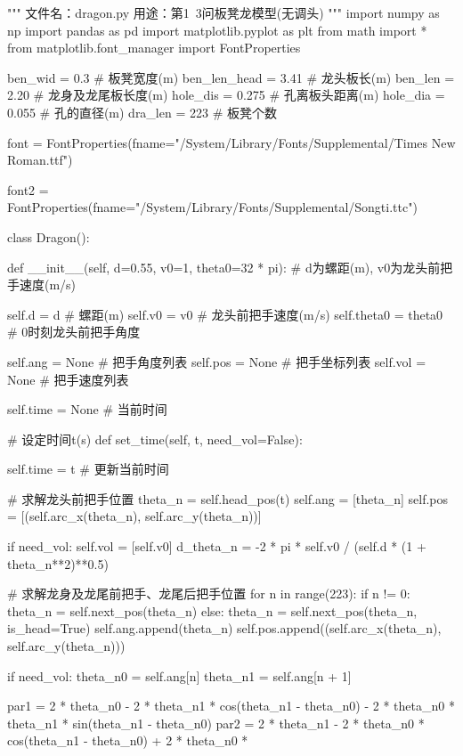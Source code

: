\documentclass[withoutpreface,bwprint]{cumcmthesis}
\begin{document}
\begin{CodeText}
"""
文件名：dragon.py
用途：第1~3问板凳龙模型(无调头)
"""
import numpy as np
import pandas as pd
import matplotlib.pyplot as plt
from math import *
from matplotlib.font_manager import FontProperties

ben_wid = 0.3 # 板凳宽度(m)
ben_len_head = 3.41 # 龙头板长(m)
ben_len = 2.20 # 龙身及龙尾板长度(m)
hole_dis = 0.275 # 孔离板头距离(m)
hole_dia = 0.055 # 孔的直径(m)
dra_len = 223 # 板凳个数

font = FontProperties(fname="/System/Library/Fonts/Supplemental/Times New Roman.ttf")



font2 = FontProperties(fname="/System/Library/Fonts/Supplemental/Songti.ttc")


class Dragon():

   def __init__(self, d=0.55, v0=1, theta0=32 * pi): # d为螺距(m), v0为龙头前把手速度(m/s)

      self.d = d # 螺距(m)
      self.v0 = v0 # 龙头前把手速度(m/s)
      self.theta0 = theta0 # 0时刻龙头前把手角度

      self.ang = None # 把手角度列表
      self.pos = None # 把手坐标列表
      self.vol = None # 把手速度列表

      self.time = None # 当前时间

   # 设定时间t(s)
   def set_time(self, t, need_vol=False):

      self.time = t # 更新当前时间

      # 求解龙头前把手位置
      theta_n = self.head_pos(t)
      self.ang = [theta_n]
      self.pos = [(self.arc_x(theta_n), self.arc_y(theta_n))]

      if need_vol:
          self.vol = [self.v0]
          d_theta_n = -2 * pi * self.v0 / (self.d * (1 + theta_n**2)**0.5)

      # 求解龙身及龙尾前把手、龙尾后把手位置
      for n in range(223):
          if n != 0:
             theta_n = self.next_pos(theta_n)
          else:
             theta_n = self.next_pos(theta_n, is_head=True)
          self.ang.append(theta_n)
          self.pos.append((self.arc_x(theta_n), self.arc_y(theta_n)))

          if need_vol:
             theta_n0 = self.ang[n]
             theta_n1 = self.ang[n + 1]

             par1 = 2 * theta_n0 - 2 * theta_n1 * cos(theta_n1 - theta_n0) - 2 * theta_n0 *
                       theta_n1 * sin(theta_n1 - theta_n0)
             par2 = 2 * theta_n1 - 2 * theta_n0 * cos(theta_n1 - theta_n0) + 2 * theta_n0 *


\end{CodeText}
\end{document}
